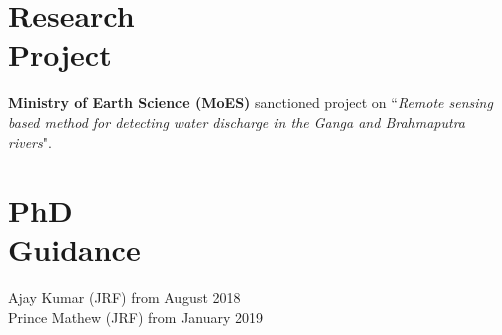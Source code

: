 \documentclass[margin]{res}
\begin{document}
\begin{resume}
				

\section{Research \\ Project}
{\bf Ministry of Earth Science (MoES)} sanctioned project on ``\emph{Remote sensing based method for detecting water discharge in the Ganga and Brahmaputra rivers}". 

%					
\section{PhD \\ Guidance}
Ajay Kumar (JRF) from August 2018 \\
Prince Mathew (JRF) from January 2019


\end{resume}
\end{document}
